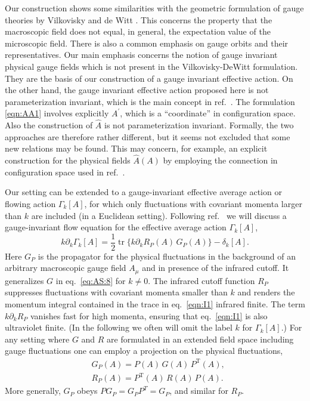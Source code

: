 \documentclass[twocolumn,aps,prd,amsmath,amssymb,preprintnumbers,longbibliography]{revtex4-1}
\numberwithin{equation}{section}
\DeclareMathOperator{\tr}{tr}
\newcommand{\transp}{\mathrm{T}}
\newenvironment{alignedeqn}{\begin{equation}\begin{aligned}}{\end{aligned}\end{equation}\ignorespacesafterend}
\begin{document}
Our construction shows some similarities with the geometric formulation of gauge theories by Vilkovisky and de Witt \cite{Vil,DeW,REB,PG1,BR,DE}. This concerns the property that the macroscopic field does not equal, in general, the expectation value of the microscopic field. There is also a common emphasis on gauge orbits and their representatives. Our main emphasis concerns the notion of gauge invariant physical gauge fields which is not present in the Vilkovisky-DeWitt formulation. They are the basis of our construction of a gauge invariant effective action. On the other hand, the gauge invariant effective action proposed here is not parameterization invariant, which is the main concept in ref.~\cite{Vil,DeW,REB,PG1,BR,DE}. The formulation \eqref{eqn:AA1} involves explicitly $A^{\prime}$, which is a ``coordinate'' in configuration space. Also the construction of $\hat{A}$ is not parameterization invariant. Formally, the two approaches are therefore rather different, but it seems not excluded that some new relations may be found. This may concern, for example, an explicit construction for the physical fields $\hat{A}(A)$ by employing the connection in configuration space used in ref.~\cite{KUN,DWMP}.

Our setting can be extended to a gauge-invariant effective average action or flowing action $\Gamma_k[A]$, for which only fluctuations with covariant momenta larger than $k$ are included (in a Euclidean setting). Following ref.~\cite{CWGIF} we will discuss a gauge-invariant flow equation for the effective average action $\Gamma_k[A]$,
\begin{equation}\label{eqn:I1}
	k \partial_k \Gamma_k[A]
	= \frac{1}{2} \tr\bigl\{k \partial_k R_P(A) \, G_P(A)\bigr\} - \delta_k[A].
\end{equation}
Here $G_P$ is the propagator for the physical fluctuations in the background of an arbitrary macroscopic gauge field $A_\mu$ and in presence of the infrared cutoff. It generalizes $G$ in eq.~\eqref{eq:AS:8} for $k\neq 0$. The infrared cutoff function $R_{P}$ suppresses fluctuations with covariant momenta smaller than $k$ and renders the momentum integral contained in the trace in eq.~\eqref{eqn:I1} infrared finite. The term $k\partial_{k}R_{P}$ vanishes fast for high momenta, ensuring that eq.~\eqref{eqn:I1} is also ultraviolet finite. (In the following we often will omit the label $k$ for $\Gamma_k[A]$.) For any setting where $G$ and $R$ are formulated in an extended field space including gauge fluctuations one can employ a projection on the physical fluctuations,
\begin{alignedeqn}\label{eqn:I2}
	&G_P(A)
	= P(A) \, G(A) \, P^\transp(A),\\
	&R_P(A)
	= P^\transp(A) \, R(A) \, P(A).
\end{alignedeqn}
More generally, $G_{P}$ obeys $PG_{P}=G_{P}P^{T}=G_{P}$, and similar for $R_{P}$.
\end{document}

